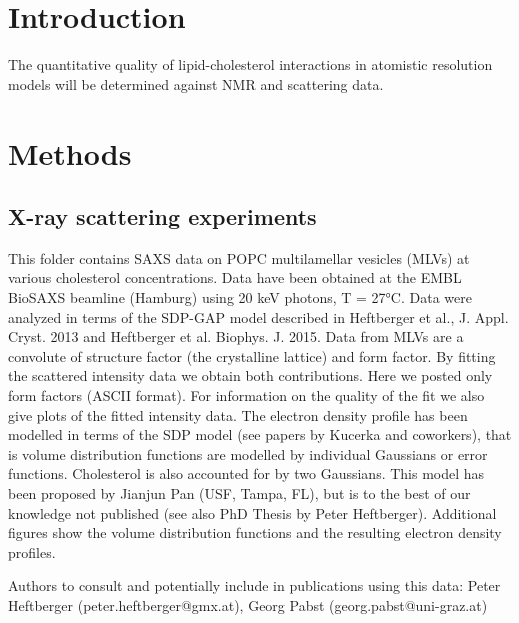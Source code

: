 \documentclass[aps,prl,superscriptaddress,twocolumn]{revtex4}
\begin{document}
\section{Introduction}
The quantitative quality of lipid-cholesterol interactions in atomistic resolution models will be determined against 
NMR and scattering data.

\section{Methods}

\subsection{X-ray scattering experiments}


This folder contains SAXS data on POPC multilamellar vesicles (MLVs) at various cholesterol concentrations. Data have been obtained at the EMBL BioSAXS beamline (Hamburg) using 20 keV photons, T = 27°C. Data were analyzed in terms of the SDP-GAP model described in Heftberger et al., J. Appl. Cryst. 2013 and Heftberger et al. Biophys. J. 2015. Data from MLVs are a convolute of structure factor (the crystalline lattice) and form factor. By fitting the scattered intensity data we obtain both contributions. Here we posted only form factors (ASCII format). For information on the quality of the fit we also give plots of the fitted intensity data. The electron density profile has been modelled in terms of the SDP model (see papers by Kucerka and coworkers), that is volume distribution functions are modelled by individual Gaussians or error functions. Cholesterol is also accounted for by two Gaussians. This model has been proposed by Jianjun Pan (USF, Tampa, FL), but is to the best of our knowledge not published (see also PhD Thesis by Peter Heftberger). Additional figures show the volume distribution functions and the resulting electron density profiles.

Authors to consult and potentially include in publications using this data: Peter Heftberger (peter.heftberger@gmx.at), Georg Pabst (georg.pabst@uni-graz.at)
\end{document}
